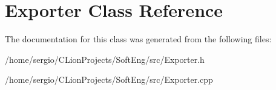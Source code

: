 \hypertarget{class_exporter}{}\section{Exporter Class Reference}
\label{class_exporter}


The documentation for this class was generated from the following files\+:\begin{DoxyCompactItemize}
\item 
/home/sergio/\+C\+Lion\+Projects/\+Soft\+Eng/src/Exporter.\+h\item 
/home/sergio/\+C\+Lion\+Projects/\+Soft\+Eng/src/Exporter.\+cpp\end{DoxyCompactItemize}

